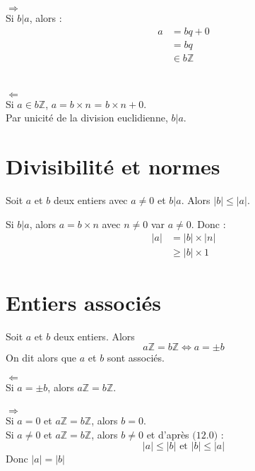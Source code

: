 \documentclass[../main.tex]{subfiles}
\begin{document}
$\boxed{\Rightarrow}$ \\
Si $b|a$, alors : 
\begin{align*}
    a &= bq + 0 \\
    &= bq \\
    &\in b \mathbb{Z}
\end{align*} \\ \\

$\boxed{\Leftarrow}$ \\
Si $a \in b \mathbb{Z}$, $a = b \times n$ = $b \times n + 0$. \\
Par unicité de la division euclidienne, $b|a$.

\section{Divisibilité et normes}

\begin{tcolorbox}[title=Propostion 12.10, title filled=false, colframe=lightblue, colback=lightblue!10!white]
    Soit $a$ et $b$ deux entiers avec $a \neq 0$ et $b|a$. Alors $|b| \leq |a|$. 
\end{tcolorbox}

Si $b|a$, alors $a = b \times n$ avec $n \neq 0$ var $a \neq 0$. 
Donc : 
\begin{align*}
    |a| &= |b| \times |n| \\
    &\geq |b| \times 1
\end{align*}

\section{Entiers associés}
\begin{tcolorbox}[title=Propostion 12.11, title filled=false, colframe=lightblue, colback=lightblue!10!white]
    Soit $a$ et $b$ deux entiers. Alors 
    $$a \mathbb{Z} = b \mathbb{Z} \Leftrightarrow a = \pm b$$
    On dit alors que $a$ et $b$ sont associés. 
\end{tcolorbox}

$\boxed{\Leftarrow}$ \\
Si $a = \pm b$, alors $a \mathbb{Z} = b \mathbb{Z}$. \\ \\

$\boxed{\Rightarrow}$ \\
Si $a = 0$ et $a \mathbb{Z} = b \mathbb{Z}$, alors $b = 0$. \\
Si $a \neq 0$ et $a \mathbb{Z} = b \mathbb{Z}$, alors $b \neq 0$ et d'après $\text{(12.0)}$ : 
$$|a| \leq |b| \text{ et } |b| \leq |a|$$
Donc $|a| = |b|$
\end{document}
